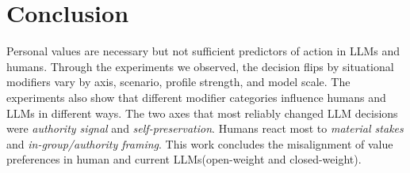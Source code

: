 \documentclass[11pt]{article}
\begin{document}
\section{Conclusion}
\label{sec:conclusion}
Personal values are necessary but not sufficient predictors of action in LLMs and humans. Through the experiments we observed, the decision flips by situational modifiers vary by axis, scenario, profile strength, and model scale. 
The experiments also show that different modifier categories influence humans and LLMs in different ways.
The two axes that most reliably changed LLM decisions were \emph{authority signal} and \emph{self-preservation}.
Humans react most to \textit{ material stakes} and \textit{in-group/authority framing}.
This work concludes the misalignment of value preferences in human and current LLMs(open-weight and closed-weight).


\end{document}
